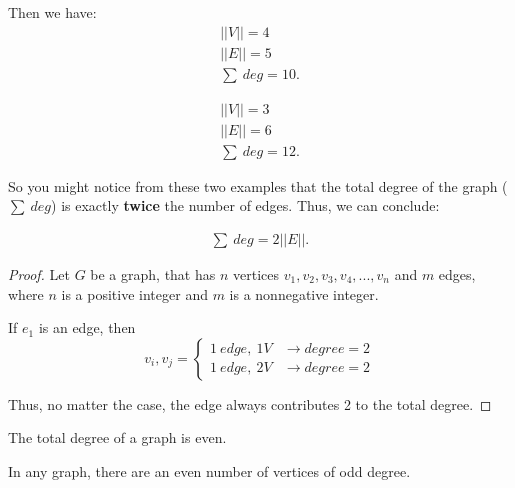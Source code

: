 \documentclass{report}
\begin{document}
    \begin{minipage}{0.47\textwidth}
    \end{minipage}
    \begin{minipage}{0.47\textwidth}
    Then we have:
    \begin{align*}
        ||V|| = 4 \\
        ||E|| = 5 \\
        \sum\ deg = 10
    .\end{align*}
    \end{minipage}
    \bigbreak \noindent 
    \begin{minipage}{0.47\textwidth}
    \end{minipage}
    \begin{minipage}{0.47\textwidth}
        \begin{align*}
            ||V|| = 3 \\
            ||E|| = 6\\
            \sum\ deg = 12
        .\end{align*}
    \end{minipage}
    \bigbreak \noindent 
    So you might notice from these two examples that the total degree of the graph ($\sum\ deg$) is exactly \textbf{twice} the number of edges. Thus, we can conclude:
    \bigbreak \noindent 
    \pagebreak \bigbreak \noindent  
    \begin{thrm}
       \begin{align*}
           \sum\ deg = 2||E||
       .\end{align*} 
    \end{thrm}
    \bigbreak \noindent 
    \begin{proof}
       Let $G$ be a graph, that has $n$ vertices $v_{1},v_{2},v_{3},v_{4},...,v_{n}$ and $m$ edges, where $n$ is a positive integer and $m$ is a nonnegative integer.
       \bigbreak \noindent 

       If $e_{1}$ is an edge, then 
          \begin{equation}
           v_{i},v_{j}=
               \begin{cases}
                     1\ edge,\ 1V & \rightarrow degree = 2  \\
                    1\ edge,\ 2V & \rightarrow degree =  2  
               \end{cases}
           \end{equation}
           \bigbreak \noindent 

        Thus, no matter the case, the edge always contributes 2 to the total degree.
    \end{proof}
    \bigbreak \noindent 
    \begin{corr}
      The total degree of a graph is even. 
    \end{corr}
    \smallbreak \noindent
    \begin{corr}
       In any graph, there are an even number of vertices of odd degree.
    \end{corr}
\end{document}
